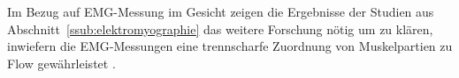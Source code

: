 Im Bezug auf EMG-Messung im Gesicht zeigen die Ergebnisse der Studien aus Abschnitt~\ref{ssub:elektromyographie} das weitere Forschung nötig um zu klären, inwiefern die \ac{EMG}-Messungen eine trennscharfe Zuordnung von Muskelpartien zu Flow gewährleistet \citep[][]{Peifer2012}.


